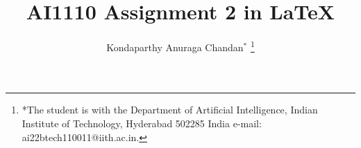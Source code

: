 \documentclass[journal,12pt,onecolumn]{IEEEtran}
\begin{document}
\let\vec\mathbf
\vspace{3cm}
\title{
AI1110 Assignment 2 in \LaTeX
}
\author{ Kondaparthy Anuraga Chandan$^{*}$%
	\thanks{*The student is with the Department
		of Artificial Intelligence, Indian Institute of Technology, Hyderabad
		502285 India e-mail: ai22btech110011@iith.ac.in.}
	
}	
%
%
%
% 
%
\end{document}
